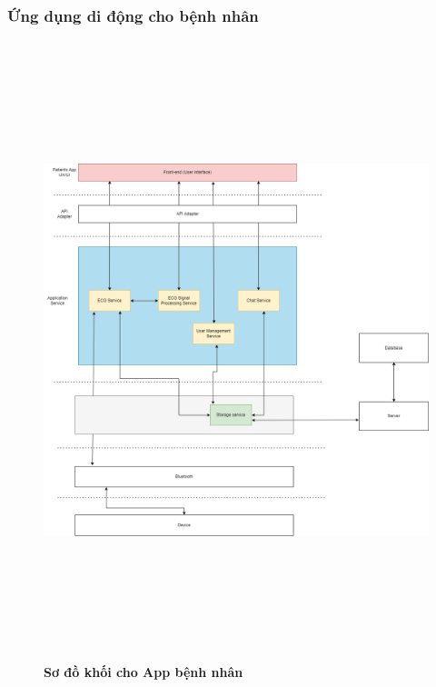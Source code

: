 \subsubsection{Ứng dụng di động cho bệnh nhân}
\mbox{}

\begin{figure}[H]
  \centering
  \includegraphics[width=16cm,height=18cm]{Images/system/fmECG_architecture-Patient.drawio.png}
  \caption[Sơ đồ khối cho App bệnh nhân]{\bfseries \fontsize{12pt}{0pt}\selectfont Sơ đồ khối cho App bệnh nhân}
  \label{fmECG_architecture-Patient} %
\end{figure}

